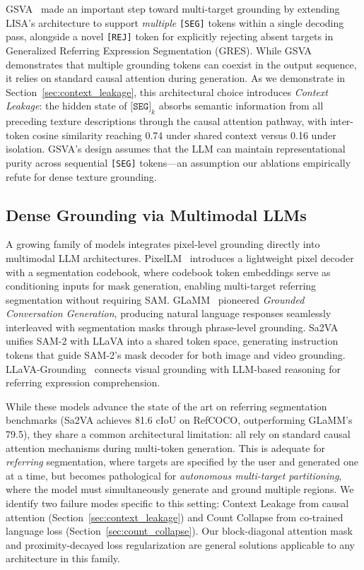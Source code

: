 \documentclass{article}
\begin{document}
GSVA~\cite{gsva} made an important step toward multi-target grounding by extending LISA's architecture to support \emph{multiple} \texttt{[SEG]} tokens within a single decoding pass, alongside a novel \texttt{[REJ]} token for explicitly rejecting absent targets in Generalized Referring Expression Segmentation (GRES). While GSVA demonstrates that multiple grounding tokens can coexist in the output sequence, it relies on standard causal attention during generation. As we demonstrate in Section~\ref{sec:context_leakage}, this architectural choice introduces \emph{Context Leakage}: the hidden state of $\texttt{[SEG]}_k$ absorbs semantic information from all preceding texture descriptions through the causal attention pathway, with inter-token cosine similarity reaching 0.74 under shared context versus 0.16 under isolation. GSVA's design assumes that the LLM can maintain representational purity across sequential \texttt{[SEG]} tokens---an assumption our ablations empirically refute for dense texture grounding.

\subsection{Dense Grounding via Multimodal LLMs}

A growing family of models integrates pixel-level grounding directly into multimodal LLM architectures. PixelLM~\cite{pixellm} introduces a lightweight pixel decoder with a segmentation codebook, where codebook token embeddings serve as conditioning inputs for mask generation, enabling multi-target referring segmentation without requiring SAM. GLaMM~\cite{glamm} pioneered \emph{Grounded Conversation Generation}, producing natural language responses seamlessly interleaved with segmentation masks through phrase-level grounding. Sa2VA~\cite{sa2va} unifies SAM-2 with LLaVA into a shared token space, generating instruction tokens that guide SAM-2's mask decoder for both image and video grounding. LLaVA-Grounding~\cite{llavaground} connects visual grounding with LLM-based reasoning for referring expression comprehension.

While these models advance the state of the art on referring segmentation benchmarks (Sa2VA achieves 81.6 cIoU on RefCOCO, outperforming GLaMM's 79.5), they share a common architectural limitation: all rely on standard causal attention mechanisms during multi-token generation. This is adequate for \emph{referring} segmentation, where targets are specified by the user and generated one at a time, but becomes pathological for \emph{autonomous multi-target partitioning}, where the model must simultaneously generate and ground multiple regions. We identify two failure modes specific to this setting: Context Leakage from causal attention (Section~\ref{sec:context_leakage}) and Count Collapse from co-trained language loss (Section~\ref{sec:count_collapse}). Our block-diagonal attention mask and proximity-decayed loss regularization are general solutions applicable to any architecture in this family.
\end{document}
